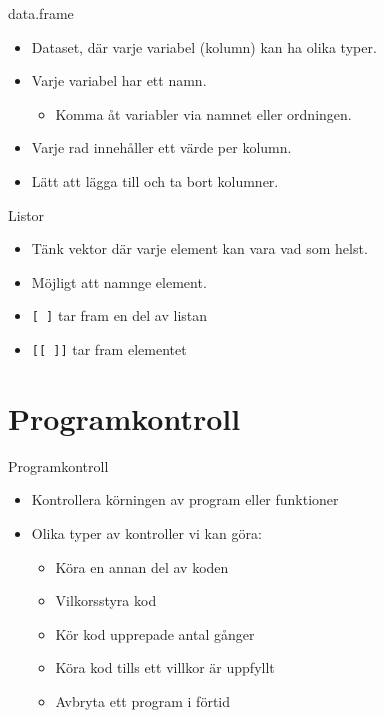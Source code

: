 \documentclass[
  11pt,
  ignorenonframetext,
]{beamer}
\providecommand{\tightlist}{%
  \setlength{\itemsep}{0pt}\setlength{\parskip}{0pt}}
\begin{document}

\begin{frame}{data.frame}
\protect\hypertarget{data.frame}{}
\begin{itemize}
\tightlist
\item
  Dataset, där varje variabel (kolumn) kan ha olika typer.
\item
  Varje variabel har ett namn.

  \begin{itemize}
  \tightlist
  \item
    Komma åt variabler via namnet eller ordningen.
  \end{itemize}
\item
  Varje rad innehåller ett värde per kolumn.
\item
  Lätt att lägga till och ta bort kolumner.
\end{itemize}
\end{frame}


\begin{frame}{Listor}
\protect\hypertarget{listor}{}
\begin{itemize}
\tightlist
\item
  Tänk vektor där varje element kan vara vad som helst.
\item
  Möjligt att namnge element.
\item
  \texttt{[ ]} tar fram en del av listan
\item
  \texttt{[[ ]]} tar fram elementet
\end{itemize}
\end{frame}

\hypertarget{programkontroll}{%
\section{Programkontroll}\label{programkontroll}}


\begin{frame}{Programkontroll}
\protect\hypertarget{programkontroll-1}{}
\begin{itemize}
\tightlist
\item
  Kontrollera körningen av program eller funktioner
\item
  Olika typer av kontroller vi kan göra:

  \begin{itemize}
  \tightlist
  \item
    Köra en annan del av koden
  \item
    Vilkorsstyra kod
  \item
    Kör kod upprepade antal gånger
  \item
    Köra kod tills ett villkor är uppfyllt
  \item
    Avbryta ett program i förtid
  \end{itemize}
\end{itemize}
\end{frame}
\end{document}
